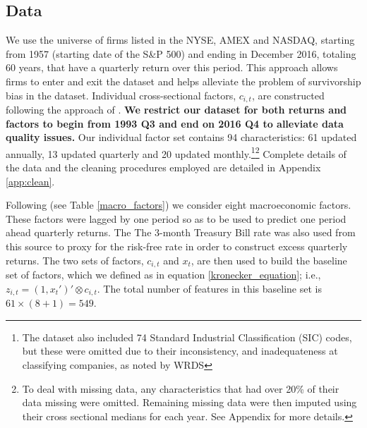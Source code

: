 \documentclass{article}
\begin{document}
\subsection{Data}
We use the universe of firms listed in the NYSE, AMEX and NASDAQ, starting from 1957 (starting date of the S\&P 500) and ending in December 2016, totaling 60 years, that have a quarterly return over this period. This approach allows firms to enter and exit the dataset and helps alleviate the problem of survivorship bias in the dataset. Individual cross-sectional factors, $c_{i,t}$, are constructed following the approach of \cite{gu_empirical_2019}. \textbf{We restrict our dataset for both returns and factors to begin from 1993 Q3 and end on 2016 Q4 to alleviate data quality issues.} Our individual factor set contains 94 characteristics: 61 updated annually, 13 updated quarterly and 20 updated monthly.\footnote{The dataset also included 74 Standard Industrial Classification (SIC) codes, but these were omitted due to their inconsistency, and inadequateness at classifying companies, as noted by WRDS}\footnote{To deal with missing data, any characteristics that had over 20\% of their data missing were omitted. Remaining missing data were then imputed using their cross sectional medians for each year. See Appendix for more details.} Complete details of the data and the cleaning procedures employed are detailed in Appendix \ref{app:clean}.


Following \cite{welch_comprehensive_2008} (see Table \ref{macro_factors}) we consider eight macroeconomic factors. These factors were lagged by one period so as to be used to predict one period ahead quarterly returns. The The 3-month Treasury Bill rate was also used from this source to proxy for the risk-free rate in order to construct excess quarterly returns. The two sets of factors, $c_{i, t}$ and $x_t$, are then used to build the baseline set of factors, which we defined as in equation \eqref{kronecker_equation}; i.e., $z_{i, t}= (1, x_t')' \otimes c_{i, t}$. The total number of features in this baseline set is $61 \times (8 + 1) = 549$.
\end{document}
